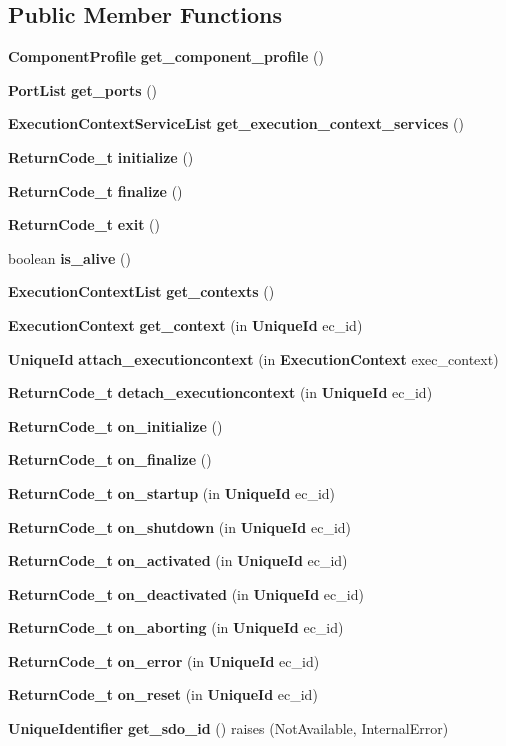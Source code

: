 \subsection*{Public Member Functions}
\begin{CompactItemize}
\item 
{\bf Component\-Profile} {\bf get\_\-component\_\-profile} ()
\item 
{\bf Port\-List} {\bf get\_\-ports} ()
\item 
{\bf Execution\-Context\-Service\-List} {\bf get\_\-execution\_\-context\_\-services} ()
\item 
{\bf Return\-Code\_\-t} {\bf initialize} ()
\item 
{\bf Return\-Code\_\-t} {\bf finalize} ()
\item 
{\bf Return\-Code\_\-t} {\bf exit} ()
\item 
boolean {\bf is\_\-alive} ()
\item 
{\bf Execution\-Context\-List} {\bf get\_\-contexts} ()
\item 
{\bf Execution\-Context} {\bf get\_\-context} (in {\bf Unique\-Id} ec\_\-id)
\item 
{\bf Unique\-Id} {\bf attach\_\-executioncontext} (in {\bf Execution\-Context} exec\_\-context)
\item 
{\bf Return\-Code\_\-t} {\bf detach\_\-executioncontext} (in {\bf Unique\-Id} ec\_\-id)
\item 
{\bf Return\-Code\_\-t} {\bf on\_\-initialize} ()
\item 
{\bf Return\-Code\_\-t} {\bf on\_\-finalize} ()
\item 
{\bf Return\-Code\_\-t} {\bf on\_\-startup} (in {\bf Unique\-Id} ec\_\-id)
\item 
{\bf Return\-Code\_\-t} {\bf on\_\-shutdown} (in {\bf Unique\-Id} ec\_\-id)
\item 
{\bf Return\-Code\_\-t} {\bf on\_\-activated} (in {\bf Unique\-Id} ec\_\-id)
\item 
{\bf Return\-Code\_\-t} {\bf on\_\-deactivated} (in {\bf Unique\-Id} ec\_\-id)
\item 
{\bf Return\-Code\_\-t} {\bf on\_\-aborting} (in {\bf Unique\-Id} ec\_\-id)
\item 
{\bf Return\-Code\_\-t} {\bf on\_\-error} (in {\bf Unique\-Id} ec\_\-id)
\item 
{\bf Return\-Code\_\-t} {\bf on\_\-reset} (in {\bf Unique\-Id} ec\_\-id)
\item 
{\bf Unique\-Identifier} {\bf get\_\-sdo\_\-id} ()  raises (Not\-Available, Internal\-Error)

\end{CompactItemize}
